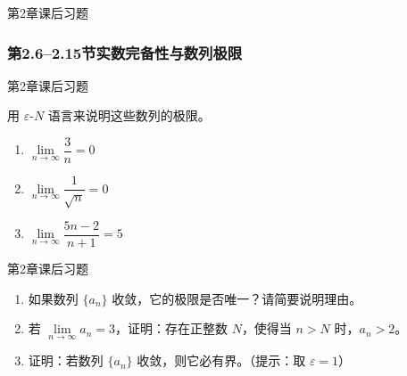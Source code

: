 \documentclass[aspectratio=169,10pt,fontset=fandol]{ctexbeamer}
\begin{document}
\begin{frame}[t,fragile]{第2章课后习题}
\normalsize
{\normalsize




\subsubsection*{第2.6--2.15节\quad 实数完备性与数列极限}






}
\end{frame}
\begin{frame}[t,fragile]{第2章课后习题}
\normalsize
{\normalsize
用 \(\varepsilon\)-\(N\) 语言来说明这些数列的极限。

\begin{enumerate}

\item \(\lim\limits_{n\to\infty} \dfrac{3}{n} = 0\)

\item \(\lim\limits_{n\to\infty} \dfrac{1}{\sqrt{n}} = 0\)

\item \(\lim\limits_{n\to\infty} \dfrac{5n-2}{n+1} = 5\)

\end{enumerate}


}
\end{frame}
\begin{frame}[t,fragile]{第2章课后习题}
\normalsize
{\normalsize
\begin{enumerate}

\item 如果数列 \(\{a_n\}\) 收敛，它的极限是否唯一？请简要说明理由。

\item 若 \(\lim\limits_{n\to\infty} a_n = 3\)，证明：存在正整数 \(N\)，使得当 \(n > N\) 时，\(a_n > 2\)。

\item 证明：若数列 \(\{a_n\}\) 收敛，则它必有界。（提示：取 \(\varepsilon = 1\)）

\end{enumerate}


}
\end{frame}
\end{document}
